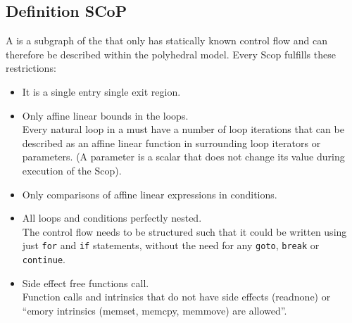 \subsection{Definition SCoP}\label{subsec:definitionScop}

A \scop is a subgraph of the \cfg that only has statically known control flow and can therefore be described within the polyhedral model.
Every Scop fulfills these restrictions:
\begin{itemize}
    \item It is a single entry single exit region.
    \item Only affine linear bounds in the loops.\\
        Every natural loop in a \scop must have a number of loop iterations that can be described as an affine linear function in surrounding loop iterators or parameters. (A parameter is a scalar that does not change its value during execution of the Scop).
    \item Only comparisons of affine linear expressions in conditions.
    \item All loops and conditions perfectly nested.\\
        The control flow needs to be structured such that it could be written using just \texttt{for} and \texttt{if} statements, without the need for any \texttt{goto}, \texttt{break} or \texttt{continue}.
    \item Side effect free functions call.\\
        Function calls and intrinsics that do not have side effects (readnone) or \enquote{emory intrinsics (memset, memcpy, memmove) are allowed}.
\end{itemize}
